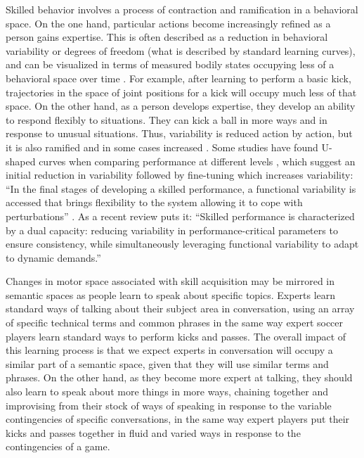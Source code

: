 \documentclass{article}
\begin{document}
Skilled behavior involves a process of contraction and ramification in a behavioral space. On the one hand, particular actions become increasingly refined as a person gains expertise. This is often described as a reduction in behavioral variability or degrees of freedom (what is described by standard learning curves), and can be visualized in terms of measured bodily states occupying less of a behavioral space over time \citep{vereijken1992freezing,adolph2015intraindividual}. For example, after learning to perform a basic kick, trajectories in the space of joint positions for a kick will occupy much less of that space. On the other hand, as a person develops expertise, they develop an ability to respond flexibly to situations. They can kick a ball in more ways and in response to unusual situations. Thus, variability is reduced action by action, but it is also ramified and in some cases increased \citep{wilson2008coordination,adolph2015intraindividual}. Some studies have found U-shaped curves when comparing performance at different levels \citep{wilson2008coordination,busquets2016differing}, which suggest an initial reduction in variability followed by fine-tuning which increases variability: ``In the final stages of developing a skilled performance, a functional variability is accessed that brings flexibility to the system allowing it to cope with perturbations'' \citep{wilson2008coordination}. As a recent review puts it: ``Skilled performance is characterized by a dual capacity: reducing variability in performance-critical parameters to ensure consistency, while simultaneously leveraging functional variability to adapt to dynamic demands.'' \citep{tsunoda2026relationship}

Changes in motor space associated with skill acquisition may be mirrored in semantic spaces as people learn to speak about specific topics. Experts learn standard ways of talking about their subject area in conversation, using an array of specific technical terms and common phrases in the same way expert soccer players learn standard ways to perform kicks and passes. The overall impact of this learning process is that we expect experts in conversation will occupy a similar part of a semantic space, given that they will use similar terms and phrases. On the other hand, as they become more expert at talking, they should also learn to speak about more things in more ways, chaining together and improvising from their stock of ways of speaking in response to the variable contingencies of specific conversations, in the same way expert players put their kicks and passes together in fluid and varied ways in response to the contingencies of a game.
\end{document}
